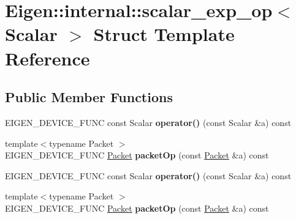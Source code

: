 \hypertarget{struct_eigen_1_1internal_1_1scalar__exp__op}{}\section{Eigen\+:\+:internal\+:\+:scalar\+\_\+exp\+\_\+op$<$ Scalar $>$ Struct Template Reference}
\label{struct_eigen_1_1internal_1_1scalar__exp__op}
\subsection*{Public Member Functions}
\begin{DoxyCompactItemize}
\item 
\mbox{\label{struct_eigen_1_1internal_1_1scalar__exp__op_ad942720c55d82955688f907940521662}} 
E\+I\+G\+E\+N\+\_\+\+D\+E\+V\+I\+C\+E\+\_\+\+F\+U\+NC const Scalar {\bfseries operator()} (const Scalar \&a) const
\item 
\mbox{\label{struct_eigen_1_1internal_1_1scalar__exp__op_a171b257ff73c7bc17cb153665de38dc4}} 
{\footnotesize template$<$typename Packet $>$ }\\E\+I\+G\+E\+N\+\_\+\+D\+E\+V\+I\+C\+E\+\_\+\+F\+U\+NC \hyperlink{union_eigen_1_1internal_1_1_packet}{Packet} {\bfseries packet\+Op} (const \hyperlink{union_eigen_1_1internal_1_1_packet}{Packet} \&a) const
\item 
\mbox{\label{struct_eigen_1_1internal_1_1scalar__exp__op_ad942720c55d82955688f907940521662}} 
E\+I\+G\+E\+N\+\_\+\+D\+E\+V\+I\+C\+E\+\_\+\+F\+U\+NC const Scalar {\bfseries operator()} (const Scalar \&a) const
\item 
\mbox{\label{struct_eigen_1_1internal_1_1scalar__exp__op_a171b257ff73c7bc17cb153665de38dc4}} 
{\footnotesize template$<$typename Packet $>$ }\\E\+I\+G\+E\+N\+\_\+\+D\+E\+V\+I\+C\+E\+\_\+\+F\+U\+NC \hyperlink{union_eigen_1_1internal_1_1_packet}{Packet} {\bfseries packet\+Op} (const \hyperlink{union_eigen_1_1internal_1_1_packet}{Packet} \&a) const
\end{DoxyCompactItemize}


